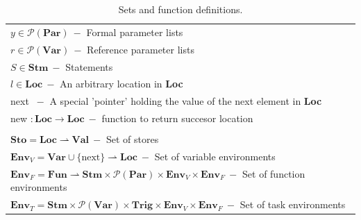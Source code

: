 \begin{table}[htb!]
\begin{tabular}{l}
        $y \in \mathcal{P} (\textbf{Par})\ -$ Formal parameter lists                                                                                                               \\
        $r \in \mathcal{P} (\textbf{Var})\ -$ Reference parameter lists                                                                                                            \\
        $S \in \textbf{Stm}\ -$ Statements                                                                                                                                         \\
        $l \in \textbf{Loc}\ -$ An arbitrary location in \textbf{Loc}                                                                                                              \\
        next $\ -$ A special 'pointer' holding the value of the next element in \textbf{Loc}                                                                                       \\
        new $: \textbf{Loc} \rightarrow \textbf{Loc}\ -$ function to return succesor location                                                                                      \\
        \\
        $\textbf{Sto} = \textbf{Loc} \rightharpoonup \textbf{Val}\ -$ Set of stores                                                                                                \\
        $\textbf{Env}_V = \textbf{Var} \cup \{\text{next}\} \rightharpoonup \textbf{Loc}\ -$ Set of variable environments                                                          \\
        $\textbf{Env}_F = \textbf{Fun} \rightharpoonup \textbf{Stm} \times \mathcal{P} (\textbf{Par}) \times \textbf{Env}_V \times \textbf{Env}_F\ -$ Set of function environments \\
        $\textbf{Env}_T = \textbf{Stm} \times \mathcal{P} (\textbf{Var}) \times \textbf{Trig} \times \textbf{Env}_V \times \textbf{Env}_F\ -$ Set of task environments             \\
        \bottomrule
    \end{tabular}
    \caption{Sets and function definitions.}
    \label{tab:setsandfunctions}
\end{table}



